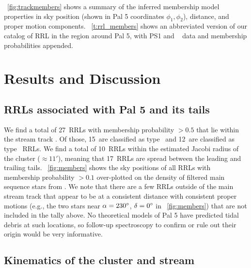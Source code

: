 \documentclass[twocolumn]{aastex63}
\newcommand{\NRRL}{27}     %
\newcommand{\NRRab}{15}    %
\newcommand{\NRRc}{12}     %
\newcommand{\NRRcl}{10}     %
\newcommand{\NRRtails}{17} %
\begin{document}
\figurename~\ref{fig:trackmembers} shows a summary of the inferred membership model properties in sky position (shown in Pal 5 coordinates $\phi_1, \phi_2$), distance, and proper motion components.
\tablename~\ref{t:rrl_members} shows an abbreviated version of our catalog of RRL in the region around Pal 5, with PS1 and \Gaia~ data and membership probabilities appended.

\section{Results and Discussion} \label{sec:results}

\subsection{RRLs associated with Pal 5 and its tails}
We find a total of \NRRL\ RRLs with membership probability $> 0.5$ that lie within the stream track \citep[again using the track from][see lines in Figure~\ref{fig:members}]{Bonaca:2019}.
Of those, \NRRab\ are classified as type \typeab\ and \NRRc\ are classified as type \typec\ RRLs.
We find a total of \NRRcl\ RRLs within the estimated Jacobi radius of the cluster ($\approx 11'$), meaning that \NRRtails\ RRLs are spread between the leading and trailing tails.
\figurename~\ref{fig:members} shows the sky positions of all RRLs with membership probability $>0.1$ over-plotted on the density of filtered main sequence stars from \citet{Bonaca:2019}.
We note that there are a few RRLs outside of the main stream track that appear to be at a consistent distance with consistent proper motions (e.g., the two stars near $\alpha = 230\mbox{$^\circ$}$, $\delta = 0\mbox{$^\circ$}$ in \figurename~\ref{fig:members}) that are not included in the tally above.
No theoretical models of Pal 5 have predicted tidal debris at such locations, so follow-up spectroscopy to confirm or rule out their origin would be very informative.

\subsection{Kinematics of the cluster and stream}
\end{document}
